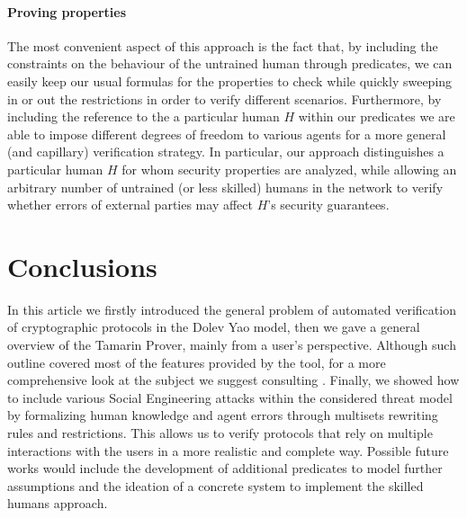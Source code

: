 \documentclass{article}
\begin{document}
\paragraph{Proving properties}

The most convenient aspect of this approach is the fact that, by including the constraints on the behaviour of the untrained human through predicates, we can easily keep our usual formulas for the properties to check while quickly sweeping in or out the restrictions in order to verify different scenarios. Furthermore, by including the reference to the a particular human $H$ within our predicates we are able to impose different degrees of freedom to various agents for a more general (and capillary) verification strategy. In particular, our approach distinguishes a particular human $H$ for whom security properties are analyzed, while allowing an arbitrary number of untrained (or less skilled) humans in the network to verify whether errors of external parties may affect $H$'s security guarantees.

\section{Conclusions}\label{sec:Conclusions}

In this article we firstly introduced the general problem of automated verification of cryptographic protocols in the Dolev Yao model, then we gave a general overview of the Tamarin Prover, mainly from a user's perspective. Although such outline covered most of the features provided by the tool, for a more comprehensive look at the subject we suggest consulting \cite{tamarinManual}. Finally, we showed how to include various Social Engineering attacks within the considered threat model by formalizing human knowledge and agent errors through multisets rewriting rules and restrictions. This allows us to verify protocols that rely on multiple interactions with the users in a more realistic and complete way. Possible future works would include the development of additional predicates to model further assumptions and the ideation of a concrete system to implement the skilled humans approach.



\end{document}
